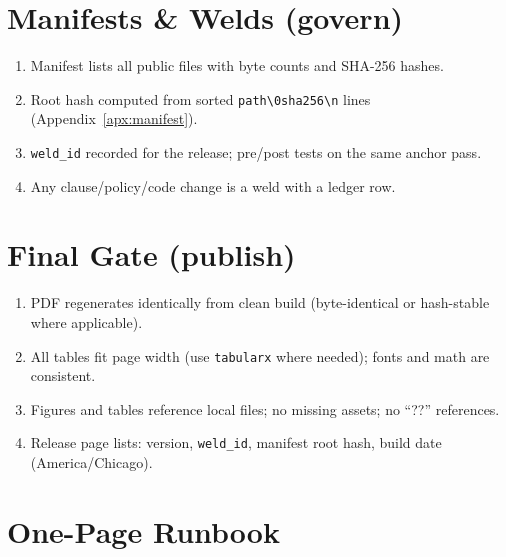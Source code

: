\section{Manifests \& Welds (govern)}
\label{sec:repro-manifest}

\begin{enumerate}[leftmargin=1.25em]
  \item Manifest lists all public files with byte counts and SHA-256 hashes.
  \item Root hash computed from sorted \texttt{path\textbackslash{}0sha256\textbackslash{}n} lines (Appendix~\ref{apx:manifest}).
  \item \texttt{weld\_id} recorded for the release; pre/post tests on the same anchor pass.
  \item Any clause/policy/code change is a weld with a ledger row.
\end{enumerate}


\section{Final Gate (publish)}
\label{sec:repro-publish}

\begin{enumerate}[leftmargin=1.25em]
  \item PDF regenerates identically from clean build (byte-identical or hash-stable where applicable).
  \item All tables fit page width (use \texttt{tabularx} where needed); fonts and math are consistent.
  \item Figures and tables reference local files; no missing assets; no “??” references.
  \item Release page lists: version, \texttt{weld\_id}, manifest root hash, build date (America/Chicago).
\end{enumerate}

\section{One-Page Runbook}
\label{sec:repro-runbook}

